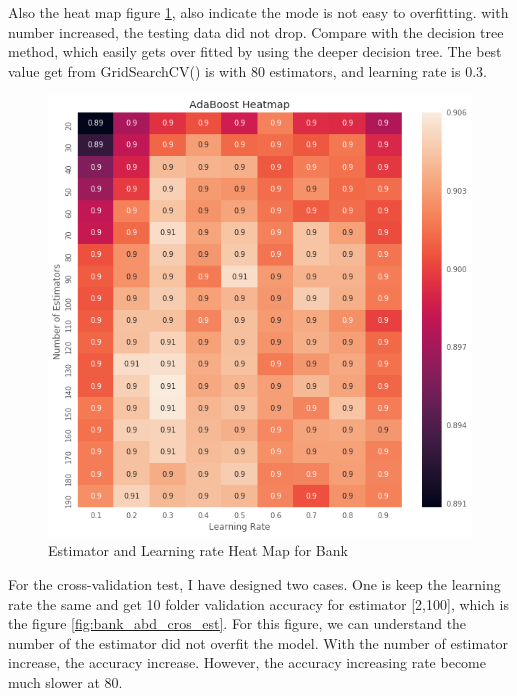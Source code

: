 \documentclass[10pt, conference, compsocconf]{IEEEtran}
\begin{document}
Also the heat map figure \ref{fig:bank_abd_heat}, also indicate the mode is not easy to overfitting. with number increased, the testing data did not drop. Compare with the decision tree method, which easily gets over fitted by using the deeper decision tree. The  best value get from GridSearchCV() is with 80 estimators, and learning rate is 0.3. 

\begin{figure}[h]
	\centering
	\includegraphics[scale = 0.3]{image/bank_abd_heat.png}
	\caption{Estimator and Learning rate Heat Map for Bank }
	\label{fig:bank_abd_heat}
\end{figure}

For the cross-validation test, I have designed two cases. One is keep the learning rate the same and get 10 folder validation accuracy for estimator [2,100], which is the figure \ref{fig:bank_abd_cros_est}. For this figure, we can understand the number of the estimator did not overfit the model. With the number of estimator increase, the accuracy increase. However, the accuracy increasing rate become much slower at 80. 
\end{document}
